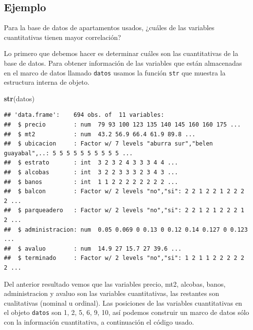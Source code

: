 \documentclass[10pt,]{krantz}
\makeatletter
\newenvironment{Shaded}{\begin{snugshade}}{\end{snugshade}}
\newcommand{\KeywordTok}[1]{\textcolor[rgb]{0.13,0.29,0.53}{\textbf{{#1}}}}
\newcommand{\NormalTok}[1]{{#1}}
\newenvironment{kframe}{%
\medskip{}
\setlength{\fboxsep}{.8em}
 \def\at@end@of@kframe{}%
 \ifinner\ifhmode%
  \def\at@end@of@kframe{\end{minipage}}%
  \begin{minipage}{\columnwidth}%
 \fi\fi%
 \def\FrameCommand##1{\hskip\@totalleftmargin \hskip-\fboxsep
 \colorbox{shadecolor}{##1}\hskip-\fboxsep
     \hskip-\linewidth \hskip-\@totalleftmargin \hskip\columnwidth}%
 \MakeFramed {\advance\hsize-\width
   \@totalleftmargin\z@ \linewidth\hsize
   \@setminipage}}%
 {\par\unskip\endMakeFramed%
 \at@end@of@kframe}
\renewenvironment{Shaded}{\begin{kframe}}{\end{kframe}}
\makeatother
\begin{document}
\subsection*{Ejemplo}\label{ejemplo-45}


Para la base de datos de apartamentos usados, ¿cuáles de las variables
cuantitativas tienen mayor correlación?

Lo primero que debemos hacer es determinar cuáles son las cuantitativas
de la base de datos. Para obtener información de las variables que están
almacenadas en el marco de datos llamado \texttt{datos} usamos la
función \texttt{str} que muestra la estructura interna de objeto.

\begin{Shaded}
\begin{Highlighting}[]
\KeywordTok{str}\NormalTok{(datos)}
\end{Highlighting}
\end{Shaded}

\begin{verbatim}
## 'data.frame':    694 obs. of  11 variables:
##  $ precio        : num  79 93 100 123 135 140 145 160 160 175 ...
##  $ mt2           : num  43.2 56.9 66.4 61.9 89.8 ...
##  $ ubicacion     : Factor w/ 7 levels "aburra sur","belen guayabal",..: 5 5 5 5 5 5 5 5 5 5 ...
##  $ estrato       : int  3 2 3 2 4 3 3 3 4 4 ...
##  $ alcobas       : int  3 2 2 3 3 3 2 3 4 3 ...
##  $ banos         : int  1 1 2 2 2 2 2 2 2 2 ...
##  $ balcon        : Factor w/ 2 levels "no","si": 2 2 1 2 2 1 2 2 2 2 ...
##  $ parqueadero   : Factor w/ 2 levels "no","si": 2 2 1 2 1 2 2 2 1 2 ...
##  $ administracion: num  0.05 0.069 0 0.13 0 0.12 0.14 0.127 0 0.123 ...
##  $ avaluo        : num  14.9 27 15.7 27 39.6 ...
##  $ terminado     : Factor w/ 2 levels "no","si": 1 2 1 1 2 2 2 2 2 2 ...
\end{verbatim}

Del anterior resultado vemos que las variables precio, mt2, alcobas,
banos, administracion y avaluo son las variables cuantitativas, las
restantes son cualitativas (nominal u ordinal). Las posiciones de las
variables cuantitativas en el objeto \texttt{datos} son 1, 2, 5, 6, 9,
10, así podemos construir un marco de datos sólo con la información
cuantitativa, a continuación el código usado.
\end{document}
